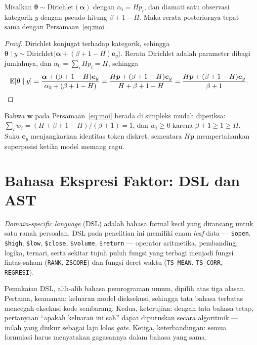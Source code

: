 \documentclass{laporanta1statugm}
\newcommand{\code}[1]{\texttt{#1}}
\begin{document}
\begin{teorema}[\code{moi} sebagai rerata posterior]
\label{teo:moi}
Misalkan $\bm{\theta}\sim\text{Dirichlet}(\bm{\alpha})$ dengan
$\alpha_i = H p_i$, dan diamati satu observasi kategorik $y$ dengan
pseudo-hitung $\beta+1-H$. Maka rerata posteriornya tepat sama dengan
Persamaan~\eqref{eq:moi}.
\end{teorema}

\begin{proof}
Dirichlet konjugat terhadap kategorik, sehingga
$\bm{\theta}\mid y \sim \text{Dirichlet}\bigl(\bm{\alpha}+(\beta+1-H)\bm{e}_y\bigr)$.
Rerata Dirichlet adalah parameter dibagi jumlahnya, dan
$\alpha_0 = \sum_i H p_i = H$, sehingga
\[
  \mathbb{E}[\bm{\theta}\mid y]
  = \frac{\bm{\alpha}+(\beta+1-H)\bm{e}_y}{\alpha_0+(\beta+1-H)}
  = \frac{H\bm{p}+(\beta+1-H)\bm{e}_y}{H+\beta+1-H}
  = \frac{H\bm{p}+(\beta+1-H)\bm{e}_y}{\beta+1}.
  \qedhere
\]
\end{proof}

Bahwa $\bm{w}$ pada Persamaan~\eqref{eq:moi} berada di simpleks mudah
diperiksa: $\sum_i w_i = (H + \beta+1-H)/(\beta+1) = 1$, dan
$w_i\ge0$ karena $\beta+1\ge1\ge H$. Suku $\bm{e}_y$ menjangkarkan identitas
token diskret, sementara $H\bm{p}$ mempertahankan superposisi ketika model
memang ragu.

\section{Bahasa Ekspresi Faktor: DSL dan AST}

\textit{Domain-specific language} (DSL) adalah bahasa formal kecil yang
dirancang untuk satu ranah persoalan. DSL pada penelitian ini memiliki enam
\textit{leaf} data --- \code{\$open}, \code{\$high}, \code{\$low},
\code{\$close}, \code{\$volume}, \code{\$return} --- operator aritmetika,
pembanding, logika, ternari, serta sekitar tujuh puluh fungsi yang terbagi
menjadi fungsi lintas-saham (\code{RANK}, \code{ZSCORE}) dan fungsi deret waktu
(\code{TS\_MEAN}, \code{TS\_CORR}, \code{REGRESI}).

Pemakaian DSL, alih-alih bahasa pemrograman umum, dipilih atas tiga alasan.
Pertama, keamanan: keluaran model dieksekusi, sehingga tata bahasa terbatas
mencegah eksekusi kode sembarang. Kedua, keterujian: dengan tata bahasa tetap,
pertanyaan ``apakah keluaran ini sah'' dapat diputuskan secara algoritmik ---
inilah yang diukur sebagai laju lolos \textit{gate}. Ketiga, keterbandingan:
semua formulasi harus menyatakan gagasannya dalam bahasa yang sama.
\end{document}
